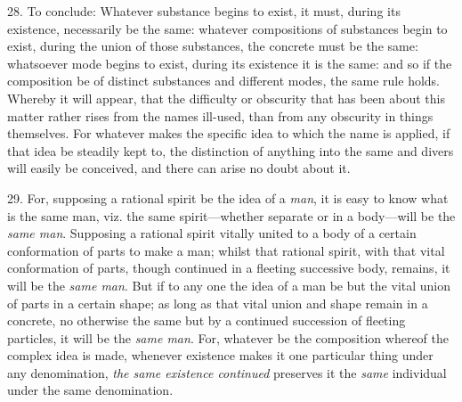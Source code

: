 28. To conclude: Whatever substance begins to exist, it must, during
its existence, necessarily be the same: whatever compositions of
substances begin to exist, during the union of those substances, the
concrete must be the same: whatsoever mode begins to exist, during its
existence it is the same: and so if the composition be of distinct
substances and different modes, the same rule holds. Whereby it will
appear, that the difficulty or obscurity that has been about this
matter rather rises from the names ill-used, than from any obscurity
in things themselves. For whatever makes the specific idea to which
the name is applied, if that idea be steadily kept to, the distinction
of anything into the same and divers will easily be conceived, and
there can arise no doubt about it.

29. For, supposing a rational spirit be the idea of a \textit{man},
 it is easy to know what is the same man, viz. the same
spir\-it---wheth\-er separate or in a bo\-dy---will be the
\textit{same man}. Supposing a rational spirit vitally united to a
body of a certain conformation of parts to make a man; whilst that
rational spirit, with that vital conformation of parts, though
continued in a fleeting successive body, remains, it will be the
\textit{same man}. But if to any one the idea of a man be but the
vital union of parts in a certain shape; as long as that vital union
and shape remain in a concrete, no otherwise the same but by a
continued succession of fleeting particles, it will be the
\textit{same man}. For, whatever be the composition whereof the
complex idea is made, whenever existence makes it one particular thing
under any denomination, \textit{the same existence continued}
preserves it the \textit{same} individual under the same denomination.


